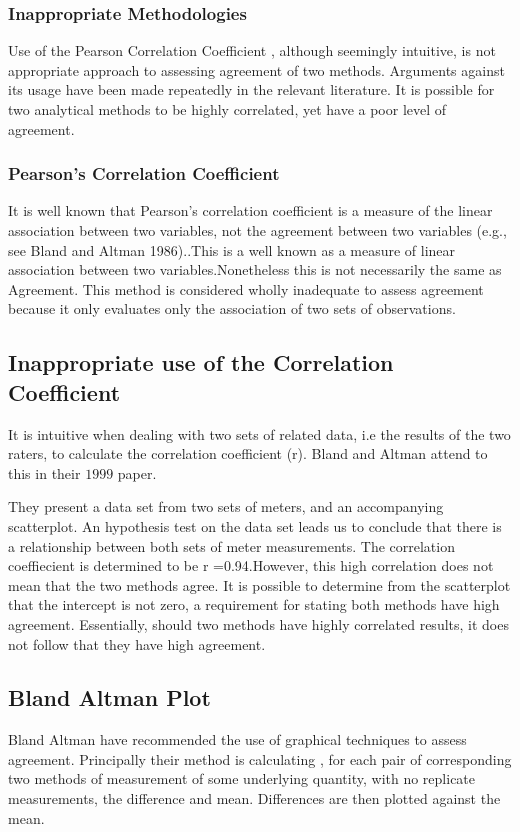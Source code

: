 \documentclass{report}
\begin{document}
\subsubsection{Inappropriate Methodologies} Use of the Pearson
Correlation Coefficient , although seemingly intuitive, is not
appropriate approach to assessing agreement of two methods.
Arguments against its usage have been made repeatedly in the
relevant literature. It is possible for two analytical methods to
be highly correlated, yet have a poor level of agreement.
\subsubsection{Pearson's Correlation Coefficient} It is well known that
Pearson's correlation coefficient is a measure of the linear
association between two variables, not the agreement between two
variables (e.g., see Bland and Altman 1986)..This is a well known
as a measure of linear association between two
variables.Nonetheless this is not necessarily the same as
Agreement. This method is considered wholly inadequate to assess
agreement because it only evaluates only the association of two
sets of observations.

\subsection{Inappropriate use of the Correlation Coefficient}
It is intuitive when dealing with two sets of related data, i.e
the results of the two raters,  to calculate the correlation
coefficient (r). Bland and Altman attend to this in their $1999$
paper.

They present a data set from two sets of meters, and an
accompanying scatterplot. An hypothesis test on the data set leads
us to conclude that there is a relationship between both sets of
meter measurements. The correlation coeffiecient is determined to
be r =0.94.However, this high correlation does not mean that the
two methods agree. It is possible to determine from the
scatterplot that the intercept is not zero, a requirement for
stating both methods have high agreement. Essentially, should two
methods have highly correlated results, it does not follow that
they have high agreement.

\subsection{Bland Altman Plot}
Bland Altman have recommended the use of graphical techniques to
assess agreement. Principally their method is calculating , for
each pair of corresponding two methods of measurement of some
underlying quantity, with no replicate measurements, the
difference and mean. Differences are then plotted against the
mean.
\end{document}
